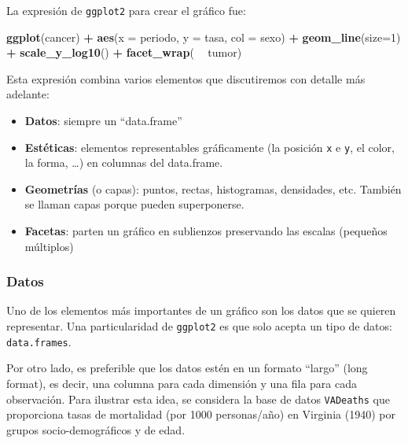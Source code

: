 \documentclass[]{article}
\newenvironment{Shaded}{\begin{snugshade}}{\end{snugshade}}
\newcommand{\DataTypeTok}[1]{\textcolor[rgb]{0.13,0.29,0.53}{#1}}
\newcommand{\DecValTok}[1]{\textcolor[rgb]{0.00,0.00,0.81}{#1}}
\newcommand{\KeywordTok}[1]{\textcolor[rgb]{0.13,0.29,0.53}{\textbf{#1}}}
\newcommand{\NormalTok}[1]{#1}
\newcommand{\OperatorTok}[1]{\textcolor[rgb]{0.81,0.36,0.00}{\textbf{#1}}}
\newcommand{\StringTok}[1]{\textcolor[rgb]{0.31,0.60,0.02}{#1}}
\providecommand{\tightlist}{%
  \setlength{\itemsep}{0pt}\setlength{\parskip}{0pt}}
\numberwithin{ejcnt}{section}
\begin{document}
La expresión de \texttt{ggplot2} para crear el gráfico fue:

\begin{Shaded}
\begin{Highlighting}[]
\KeywordTok{ggplot}\NormalTok{(cancer) }\OperatorTok{+}
\StringTok{  }\KeywordTok{aes}\NormalTok{(}\DataTypeTok{x =}\NormalTok{ periodo, }\DataTypeTok{y =}\NormalTok{ tasa, }\DataTypeTok{col =}\NormalTok{ sexo) }\OperatorTok{+}
\StringTok{  }\KeywordTok{geom_line}\NormalTok{(}\DataTypeTok{size=}\DecValTok{1}\NormalTok{) }\OperatorTok{+}\StringTok{ }\KeywordTok{scale_y_log10}\NormalTok{() }\OperatorTok{+}
\StringTok{  }\KeywordTok{facet_wrap}\NormalTok{( }\OperatorTok{~}\StringTok{ }\NormalTok{tumor) }
\end{Highlighting}
\end{Shaded}

Esta expresión combina varios elementos que discutiremos con detalle más adelante:

\begin{itemize}
\tightlist
\item
  \textbf{Datos}: siempre un ``data.frame''
\item
  \textbf{Estéticas}: elementos representables gráficamente (la posición \texttt{x} e \texttt{y}, el color, la forma, \ldots) en columnas del data.frame.
\item
  \textbf{Geometrías} (o capas): puntos, rectas, histogramas, densidades, etc. También se llaman capas porque pueden superponerse.
\item
  \textbf{Facetas}: parten un gráfico en sublienzos preservando las escalas (pequeños múltiplos)
\end{itemize}

\hypertarget{datos}{%
\subsubsection{Datos}\label{datos}}

Uno de los elementos más importantes de un gráfico son los datos que se quieren representar. Una particularidad de \texttt{ggplot2} es que solo acepta un tipo de datos: \texttt{data.frames}.

Por otro lado, es preferible que los datos estén en un formato ``largo'' (long format), es decir, una columna para cada dimensión y una fila para cada observación.
Para ilustrar esta idea, se considera la base de datos \texttt{VADeaths} que proporciona tasas de mortalidad (por 1000 personas/año) en Virginia (1940) por grupos socio-demográficos y de edad.
\end{document}
